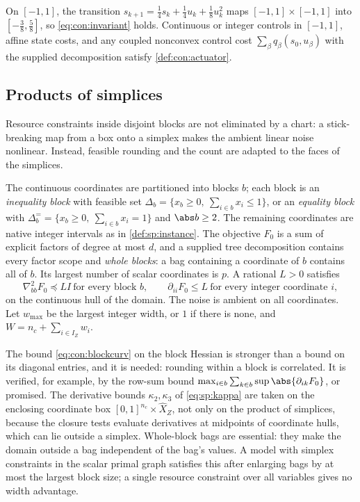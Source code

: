 \begin{example}\label{ex:con:actuator}
On $[-1,1]$, the transition $s_{k+1}=\frac14s_k+\frac14u_k+\frac18u_k^2$ maps
$[-1,1]\times[-1,1]$ into $[-\frac38,\frac58]$, so \eqref{eq:con:invariant}
holds. Continuous or integer controls in $[-1,1]$, affine state costs, and
any coupled nonconvex control cost $\sum_\beta q_\beta(s_0,u_\beta)$ with the
supplied decomposition satisfy \cref{def:con:actuator}.
\end{example}

\subsection{Products of simplices}\label{sec:con:simplex}

Resource constraints inside disjoint blocks are not eliminated by a chart: a
stick-breaking map from a box onto a simplex makes the ambient linear noise
nonlinear. Instead, feasible rounding and the count are adapted to the faces
of the simplices.

\begin{definition}\label{def:con:simplex}
The continuous coordinates are partitioned into blocks $b$; each block is an
\emph{inequality block} with feasible set $\Delta_b=\{x_b\ge0,\
\sum_{i\in b}x_i\le1\}$, or an \emph{equality block} with
$\Delta_b^==\{x_b\ge0,\ \sum_{i\in b}x_i=1\}$ and $\abs b\ge2$. The remaining
coordinates are native integer intervals as in \cref{def:sp:instance}. The
objective $F_0$ is a sum of explicit factors of degree at most $d$, and a
supplied tree decomposition contains every factor scope and \emph{whole
blocks}: a bag containing a coordinate of $b$ contains all of $b$. Its
largest number of scalar coordinates is $p$. A rational $L>0$ satisfies
\begin{equation}\label{eq:con:blockcurv}
 \nabla^2_{bb}F_0\preceq LI\ \text{for every block }b,\qquad
 \partial_{ii}F_0\le L\ \text{for every integer coordinate }i,
\end{equation}
on the continuous hull of the domain. The noise is ambient on all
coordinates. Let $w_{\max}$ be the largest integer width, or $1$ if there is
none, and $W=n_c+\sum_{i\in I_Z}w_i$.
\end{definition}

The bound \eqref{eq:con:blockcurv} on the block Hessian is stronger than a
bound on its diagonal entries, and it is needed: rounding within a block is
correlated. It is verified, for example, by the row-sum bound
$\max_{i\in b}\sum_{k\in b}\sup\abs{\partial_{ik}F_0}$, or promised. The
derivative bounds $\kappa_2,\kappa_3$ of \eqref{eq:sp:kappa} are taken on the
enclosing coordinate box $[0,1]^{n_c}\times\widehat X_Z$, not only on the
product of simplices, because the closure tests evaluate derivatives at
midpoints of coordinate hulls, which can lie outside a simplex. Whole-block
bags are essential: they make the domain outside a bag independent of the
bag's values. A model with simplex constraints in the scalar primal graph
satisfies this after enlarging bags by at most the largest block size; a
single resource constraint over all variables gives no width advantage.

